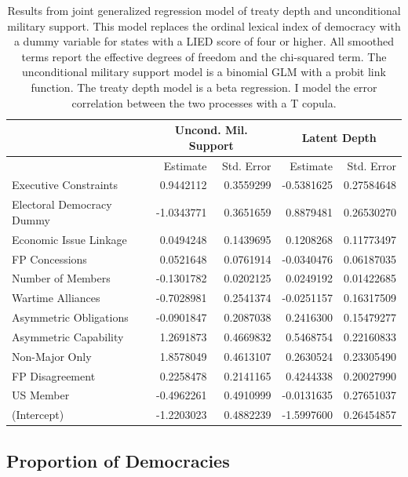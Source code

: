 \documentclass[12pt]{article}
\begin{document}
\begin{table}[ht]
\centering
\begin{tabular}{lrrrr}
  & \multicolumn{2}{c}{Uncond. Mil. Support} & \multicolumn{2}{c}{Latent Depth}\\ \hline
 & Estimate & Std. Error & Estimate & Std. Error  \\ 
  \hline
  Executive Constraints & 0.9442112 & 0.3559299 & -0.5381625 & 0.27584648 \\ 
  Electoral Democracy Dummy & -1.0343771 & 0.3651659 & 0.8879481 & 0.26530270 \\ 
  Economic Issue Linkage & 0.0494248 & 0.1439695 & 0.1208268 & 0.11773497 \\ 
  FP Concessions & 0.0521648 & 0.0761914 & -0.0340476 & 0.06187035 \\ 
  Number of Members & -0.1301782 & 0.0202125 & 0.0249192 & 0.01422685 \\ 
  Wartime Alliances & -0.7028981 & 0.2541374 & -0.0251157 & 0.16317509 \\ 
  Asymmetric Obligations & -0.0901847 & 0.2087038 & 0.2416300 & 0.15479277 \\ 
  Asymmetric Capability & 1.2691873 & 0.4669832 & 0.5468754 & 0.22160833 \\ 
  Non-Major Only & 1.8578049 & 0.4613107 & 0.2630524 & 0.23305490 \\ 
  FP Disagreement & 0.2258478 & 0.2141165 & 0.4244338 & 0.20027990 \\ 
  US Member & -0.4962261 & 0.4910999 & -0.0131635 & 0.27651037 \\ 
  (Intercept) & -1.2203023 & 0.4882239 & -1.5997600 & 0.26454857 \\ 
   \hline
\end{tabular}
\caption{Results from joint generalized regression model of treaty depth and unconditional military support. 
                     This model replaces the ordinal lexical index of democracy with a dummy variable for states with a LIED score of four or higher.
                     All smoothed terms report the effective degrees of freedom and the chi-squared term. 
                     The unconditional military support model is a binomial GLM with a probit link function. 
                     The treaty depth model is a beta regression. 
                     I model the error correlation between the two processes with a T copula.} 
\label{tab:gjrm-res-lih}
\end{table}


\subsection{Proportion of Democracies}
\end{document}
